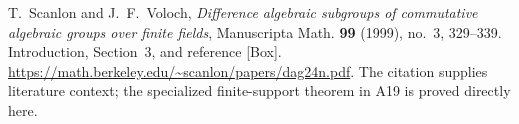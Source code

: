 T.~Scanlon and J.~F.~Voloch,
\emph{Difference algebraic subgroups of commutative algebraic
groups over finite fields},
Manuscripta Math. \textbf{99} (1999), no.~3, 329--339.
Introduction, Section~3, and reference \textnormal{[Box]}.
\url{https://math.berkeley.edu/~scanlon/papers/dag24n.pdf}.
The citation supplies literature context; the specialized
finite-support theorem in A19 is proved directly here.
